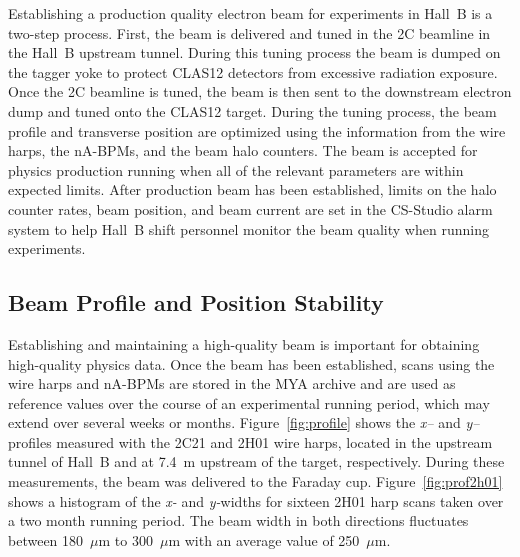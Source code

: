 Establishing a production quality electron beam for experiments in Hall~B is a two-step process. First, the beam is
delivered and tuned in the 2C beamline in the Hall~B upstream tunnel. During this tuning process the beam is dumped
on the tagger yoke to protect CLAS12 detectors from excessive radiation exposure. Once the 2C beamline is tuned,
the beam is then sent to the downstream electron dump and tuned onto the CLAS12 target. During the tuning process,
the beam profile and transverse position are optimized using the information from the wire harps, the nA-BPMs, and
the beam halo counters. The beam is accepted for physics production running when all of the relevant parameters are
within expected limits. After production beam has been established,  limits on the halo counter rates, beam position,
and beam current are set in the CS-Studio alarm system to help Hall~B shift personnel monitor the beam quality
when running experiments.  

\subsection{Beam Profile and Position Stability}

Establishing and maintaining a high-quality beam is important for obtaining high-quality physics data. Once the beam
has been established, scans using the wire harps and nA-BPMs are stored in the MYA archive and are used as
reference values over the course of an experimental running period, which may extend over several weeks or months.
Figure~\ref{fig:profile}  shows the {\it x--} and {\it y--}profiles measured with the 2C21 and 2H01 wire harps,
located in the upstream tunnel of Hall~B and at 7.4~m upstream of the target, respectively. During these
measurements, the beam was delivered to the Faraday cup. Figure~\ref{fig:prof2h01} shows a histogram of the
{\it x-} and {\it y-}widths for sixteen 2H01 harp scans taken over a two month running period.  The beam width in
both directions fluctuates between 180~$\mu$m to 300~$\mu$m with an average value of 250~$\mu$m. 

